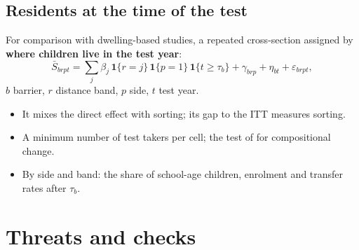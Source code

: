 \documentclass[11pt]{article}
\begin{document}
\subsection{Residents at the time of the test}

For comparison with dwelling-based studies, a repeated cross-section assigned by \textbf{where
children live in the test year}:
\[
\bar S_{b r p t} = \sum_{j} \beta_j\, \mathbf{1}\{r = j\}\, \mathbf{1}\{p = 1\}\, \mathbf{1}\{t \ge \tau_b\} + \gamma_{b r p} + \eta_{b t} + \varepsilon_{b r p t},
\]
\(b\) barrier, \(r\) distance band, \(p\) side, \(t\) test year.
\begin{itemize}
\item It mixes the direct effect with sorting; its gap to the ITT measures sorting.
\item A minimum number of test takers per cell; the test of
  \textcite{santannaDifferenceinDifferencesCompositionalChanges2025} for compositional change.
\item By side and band: the share of school-age children, enrolment and transfer rates after
  \(\tau_b\).
\end{itemize}

\section{Threats and checks}\label{sec:threats}
\end{document}
